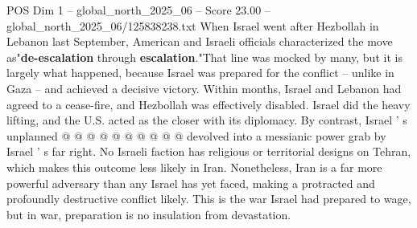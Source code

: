 \begin{textsample}{POS Dim 1 – global\_north\_2025\_06 – Score 23.00 – global\_north\_2025\_06/125838238.txt}
When Israel went after Hezbollah in Lebanon last September, American and Israeli officials characterized the move as"\textbf{de-escalation} through \textbf{escalation}."That line was mocked by many, but it is largely what happened, because Israel was prepared for the conflict -- unlike in Gaza -- and achieved a decisive victory.
Within months, Israel and Lebanon had agreed to a cease-fire, and Hezbollah was effectively disabled.
Israel did the heavy lifting, and the U.S. acted as the closer with its diplomacy.
By contrast, Israel ' s unplanned @ @ @ @ @ @ @ @ @ @ devolved into a messianic power grab by Israel ' s far right.
No Israeli faction has religious or territorial designs on Tehran, which makes this outcome less likely in Iran.
Nonetheless, Iran is a far more powerful adversary than any Israel has yet faced, making a protracted and profoundly destructive conflict likely.
This is the war Israel had prepared to wage, but in war, preparation is no insulation from devastation.

\end{textsample}
